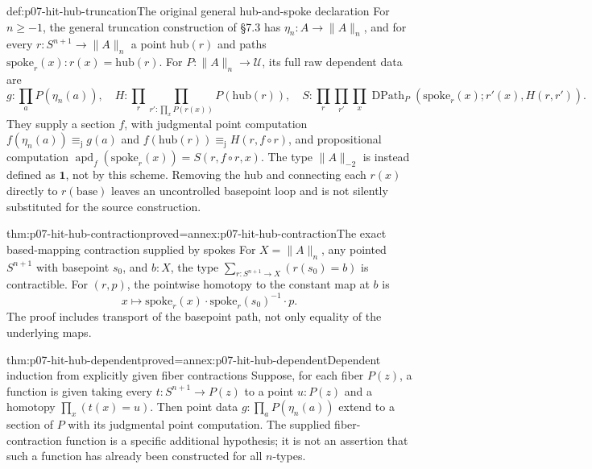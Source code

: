 \begin{hbdefinition}{def:p07-hit-hub-truncation}{The original general hub-and-spoke declaration}
For \(n\ge-1\), the general truncation construction of \S7.3 has
\(\eta_n:A\to\|A\|_n\), and for every
\(r:S^{n+1}\to\|A\|_n\) a point \(\mathrm{hub}(r)\) and paths
\(\mathrm{spoke}_r(x):r(x)=\mathrm{hub}(r)\).
For \(P:\|A\|_n\to\mathcal U\), its full raw dependent data are
\[
 g:\prod_aP(\eta_n(a)),\quad
 H:\prod_r\prod_{r':\prod_xP(r(x))}P(\mathrm{hub}(r)),
 \quad
 S:\prod_r\prod_{r'}\prod_x
       \operatorname{DPath}_P(\mathrm{spoke}_r(x);r'(x),H(r,r')).
\]
They supply a section \(f\), with judgmental point computation
\(f(\eta_n(a))\equiv_{\mathrm j}g(a)\) and
\(f(\mathrm{hub}(r))\equiv_{\mathrm j}H(r,f\circ r)\), and
propositional computation
\(\operatorname{apd}_f(\mathrm{spoke}_r(x))=S(r,f\circ r,x)\).
The type \(\|A\|_{-2}\) is instead defined as \(\mathbf1\), not by
this scheme. Removing the hub and connecting each \(r(x)\) directly to
\(r(\mathrm{base})\) leaves an uncontrolled basepoint loop and is not
silently substituted for the source construction.
\end{hbdefinition}

\begin{hbtheorem}{thm:p07-hit-hub-contraction}{proved=annex:p07-hit-hub-contraction}{The exact based-mapping contraction supplied by spokes}
For \(X=\|A\|_n\), any pointed \(S^{n+1}\) with basepoint \(s_0\),
and \(b:X\), the type
\(\sum_{r:S^{n+1}\to X}(r(s_0)=b)\) is contractible.
For \((r,p)\), the pointwise homotopy to the constant map at \(b\) is
\[
 x\longmapsto\mathrm{spoke}_r(x)\cdot
                 \mathrm{spoke}_r(s_0)^{-1}\cdot p.
\]
The proof includes transport of the basepoint path, not only equality of the
underlying maps.
\end{hbtheorem}

\begin{hbtheorem}{thm:p07-hit-hub-dependent}{proved=annex:p07-hit-hub-dependent}{Dependent induction from explicitly given fiber contractions}
Suppose, for each fiber \(P(z)\), a function is given taking every
\(t:S^{n+1}\to P(z)\) to a point \(u:P(z)\) and a homotopy
\(\prod_x(t(x)=u)\). Then point data
\(g:\prod_aP(\eta_n(a))\) extend to a section of \(P\) with its
judgmental point computation. The supplied fiber-contraction function is a
specific additional hypothesis; it is not an assertion that such a function
has already been constructed for all \(n\)-types.
\end{hbtheorem}

